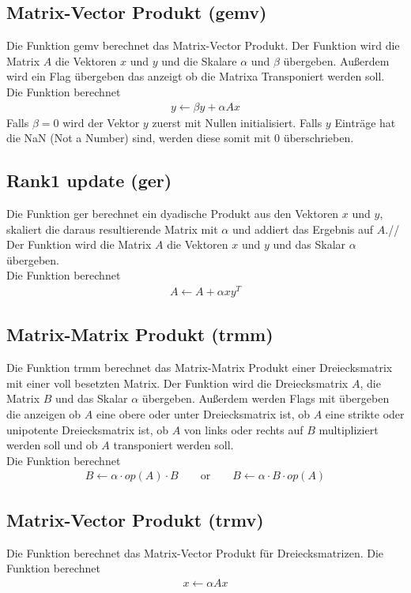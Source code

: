 \subsection{Matrix-Vector Produkt (gemv)}
Die Funktion gemv berechnet das Matrix-Vector Produkt.
Der Funktion wird die Matrix $A$ die Vektoren $x$ und $y$ und die Skalare $\alpha$ und $\beta$ übergeben. Außerdem wird ein Flag übergeben das anzeigt ob die Matrixa Transponiert werden soll.\\
Die Funktion berechnet
\begin{align}
	y \leftarrow \beta  y + \alpha A x 
\end{align}
Falls $\beta = 0$ wird der Vektor $y$ zuerst mit Nullen initialisiert. Falls $y$ Einträge hat die NaN (Not a Number) sind, werden diese somit mit 0 überschrieben.
\subsection{Rank1 update (ger)}
Die Funktion ger berechnet ein dyadische Produkt aus den Vektoren $x$ und $y$, skaliert die daraus resultierende Matrix mit $\alpha$ und addiert das Ergebnis auf $A$.//
Der Funktion wird die Matrix $A$ die Vektoren $x$ und $y$ und das Skalar $\alpha$ übergeben.\\
Die Funktion berechnet
\begin{align}
	A \leftarrow A + \alpha  x y^T
\end{align}

\subsection{Matrix-Matrix Produkt (trmm)}
Die Funktion trmm berechnet das Matrix-Matrix Produkt einer Dreiecksmatrix mit einer voll besetzten Matrix.
Der Funktion wird die Dreiecksmatrix $A$, die Matrix $B$ und das Skalar $\alpha$ übergeben. Außerdem werden Flags mit übergeben die anzeigen ob $A$ eine obere oder unter Dreiecksmatrix ist, ob $A$ eine strikte oder unipotente Dreiecksmatrix ist, ob $A$ von links oder rechts auf $B$ multipliziert werden soll und ob $A$ transponiert werden soll.
\\
Die Funktion berechnet
\begin{align}
B \leftarrow  \alpha \cdot op(A) \cdot B \qquad \text{or} \qquad B \leftarrow  \alpha \cdot B \cdot op(A)
\end{align}
\subsection{Matrix-Vector Produkt (trmv)}
Die Funktion berechnet das Matrix-Vector Produkt für Dreiecksmatrizen.
Die Funktion berechnet
\begin{align}
x \leftarrow \alpha  Ax %
\end{align}

